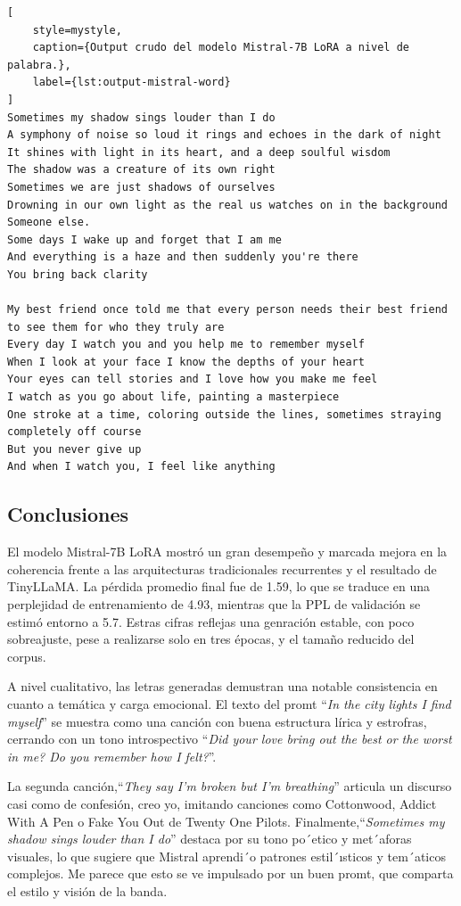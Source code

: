 \begin{lstlisting}[
    style=mystyle,
    caption={Output crudo del modelo Mistral-7B LoRA a nivel de palabra.},
    label={lst:output-mistral-word}
]
Sometimes my shadow sings louder than I do
A symphony of noise so loud it rings and echoes in the dark of night
It shines with light in its heart, and a deep soulful wisdom
The shadow was a creature of its own right
Sometimes we are just shadows of ourselves
Drowning in our own light as the real us watches on in the background
Someone else.
Some days I wake up and forget that I am me
And everything is a haze and then suddenly you're there
You bring back clarity

My best friend once told me that every person needs their best friend to see them for who they truly are
Every day I watch you and you help me to remember myself
When I look at your face I know the depths of your heart
Your eyes can tell stories and I love how you make me feel
I watch as you go about life, painting a masterpiece
One stroke at a time, coloring outside the lines, sometimes straying completely off course
But you never give up
And when I watch you, I feel like anything
\end{lstlisting}

\subsection{Conclusiones}

El modelo Mistral-7B LoRA mostró un gran desempeño y marcada mejora en la coherencia frente a las
arquitecturas tradicionales recurrentes y el resultado de TinyLLaMA. La pérdida promedio final 
fue de 1.59, lo que se traduce en una perplejidad de entrenamiento de 4.93, mientras que la PPL
de validación se estimó entorno a 5.7. Estras cifras reflejas una genración estable, con poco
sobreajuste, pese a realizarse solo en tres épocas, y el tamaño reducido del corpus. 

A nivel cualitativo, las letras generadas demustran una notable consistencia en cuanto a temática
y carga emocional. El texto del promt ``\textit{In the city lights I find myself}'' se muestra como una
canción con buena estructura lírica y estrofras, cerrando con un tono introspectivo ``\textit{Did your love bring out the best or the worst in me?
Do you remember how I felt?}''.  

La segunda canción,``\textit{They say I’m broken but I’m breathing}'' articula un discurso casi como 
de confesión, creo yo, imitando canciones como Cottonwood, Addict With A Pen o Fake You Out de 
Twenty One Pilots.  Finalmente,``\textit{Sometimes my shadow sings louder than I do}'' destaca por su
tono po´etico y met´aforas visuales, lo que sugiere que Mistral aprendi´o patrones 
estil´ısticos y tem´aticos complejos. Me parece que esto se ve impulsado por un buen promt, que
comparta el estilo y visión de la banda.

